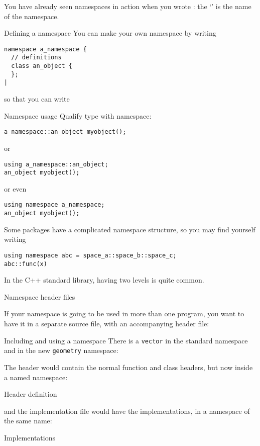 You have already seen namespaces in action when you wrote
: the `' is the name of the namespace.

\begin{block}{Defining a namespace}
  \label{sl:namespace-def}
  You can make your own namespace by writing
\begin{lstlisting}
namespace a_namespace {
  // definitions
  class an_object { 
  };
|
\end{lstlisting}
\end{block}

so that you can write
\begin{block}{Namespace usage}
  \label{sl:namespace-use}
Qualify type with namespace:
\begin{lstlisting}
a_namespace::an_object myobject();
\end{lstlisting}
or
\begin{lstlisting}
using a_namespace::an_object;
an_object myobject();
\end{lstlisting}
or even
\begin{lstlisting}
using namespace a_namespace;
an_object myobject();
\end{lstlisting}
\end{block}

Some packages have a complicated namespace structure,
so you may find yourself writing
\begin{lstlisting}
using namespace abc = space_a::space_b::space_c;
abc::func(x)
\end{lstlisting}
In the C++ standard library, having two levels is quite common.

 {Namespace header files}

If your namespace is going to be used in more than one program, you
want to have it in a separate source file, with an accompanying header
file:
%
\begin{block}{Including and using a namespace}
  \label{sl:nameinclude}
  There is a \lstinline{vector} in the standard namespace
  and in the new \lstinline{geometry} namespace:
\end{block}

The header would contain the normal function and class headers, but
now inside a named namespace:
%
\begin{block}{Header definition}
  \label{sl:nameheader}
\end{block}

and the implementation file would have the implementations,
in a
namespace of the same name:
%
\begin{block}{Implementations}
  \label{sl:nameimpl}
\end{block}

